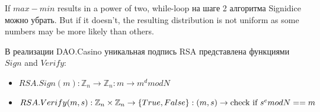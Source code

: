 \begin{remark}
If  $max -  min$  results in a power of two, while-loop на шаге 2 алгоритма Signidice можно убрать. But if it doesn’t, the resulting distribution is not uniform as some numbers may be more likely than others.
\end{remark}

В реализации DAO.Casino уникальная подпись RSA представлена функциями $Sign$ and $Verify$:
\begin{itemize}
	\item $RSA.Sign(m): \mathbb{Z}_n \rightarrow \mathbb{Z}_n: m \rightarrow m^d mod N$
	\item $RSA.Verify(m, s): \mathbb{Z}_n \times \mathbb{Z}_n \rightarrow \{True, False\}: (m, s) \rightarrow \text{check if } \\ s^e mod N == m $
\end{itemize}
